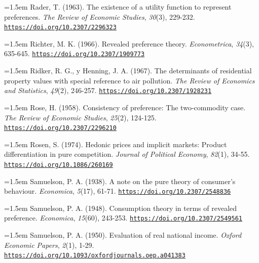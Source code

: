 \documentclass[10pt,a4paper]{article}
\begin{document}
\noindent\hangindent=1.5em Rader, T. (1963). The existence of a utility function to represent preferences. \textit{The Review of Economic Studies}, \textit{30}(3), 229-232. \href{https://doi.org/10.2307/2296323}{\nolinkurl{https://doi.org/10.2307/2296323}}

{\sloppy\noindent\hangindent=1.5em Richter, M. K. (1966). Revealed preference theory. \textit{Econometrica}, \textit{34}(3), 635-645. \href{https://doi.org/10.2307/1909773}{\nolinkurl{https://doi.org/10.2307/1909773}}\par}

\noindent\hangindent=1.5em Ridker, R. G., y Henning, J. A. (1967). The determinants of residential property values with special reference to air pollution. \textit{The Review of Economics and Statistics}, \textit{49}(2), 246-257. \href{https://doi.org/10.2307/1928231}{\nolinkurl{https://doi.org/10.2307/1928231}}

\noindent\hangindent=1.5em Rose, H. (1958). Consistency of preference: The two-commodity case. \textit{The Review of Economic Studies}, \textit{25}(2), 124-125. \href{https://doi.org/10.2307/2296210}{\nolinkurl{https://doi.org/10.2307/2296210}}

{\sloppy\noindent\hangindent=1.5em Rosen, S. (1974). Hedonic prices and implicit markets: Product differentiation in pure competition. \textit{Journal of Political Economy}, \textit{82}(1), 34-55. \href{https://doi.org/10.1086/260169}{\nolinkurl{https://doi.org/10.1086/260169}}\par}

\noindent\hangindent=1.5em Samuelson, P. A. (1938). A note on the pure theory of consumer's behaviour. \textit{Economica}, \textit{5}(17), 61-71. \href{https://doi.org/10.2307/2548836}{\nolinkurl{https://doi.org/10.2307/2548836}}

\noindent\hangindent=1.5em Samuelson, P. A. (1948). Consumption theory in terms of revealed preference. \textit{Economica}, \textit{15}(60), 243-253. \href{https://doi.org/10.2307/2549561}{\nolinkurl{https://doi.org/10.2307/2549561}}

{\sloppy\noindent\hangindent=1.5em Samuelson, P. A. (1950). Evaluation of real national income. \textit{Oxford Economic Papers}, \textit{2}(1), 1-29. \href{https://doi.org/10.1093/oxfordjournals.oep.a041383}{\nolinkurl{https://doi.org/10.1093/oxfordjournals.oep.a041383}}\par}
\end{document}
